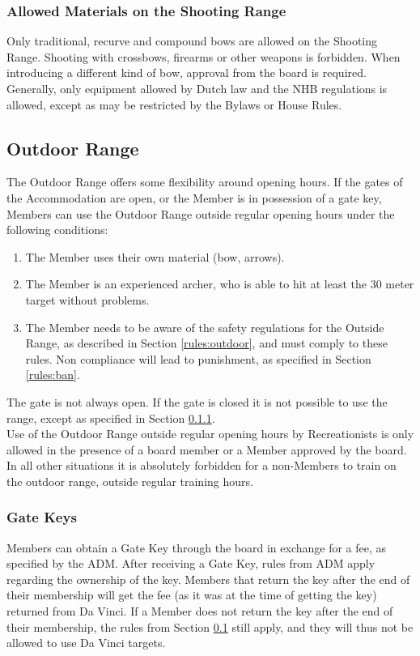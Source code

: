 \documentclass[a4paper]{article}
\begin{document}
\subsubsection{Allowed Materials on the Shooting Range}
Only traditional, recurve and compound bows are allowed on the Shooting Range. Shooting with crossbows, firearms or other weapons is forbidden. When introducing a different kind of bow, approval from the board is required. Generally, only equipment allowed by Dutch law and the { NHB} regulations is allowed, except as may be restricted by the Bylaws or House Rules.

\subsection{Outdoor Range}
\label{section:outdoor}
The Outdoor Range offers some flexibility around opening hours. If the gates of the { Accommodation} are open, or the { Member} is in possession of a gate key, { Members} can use the Outdoor Range outside regular opening hours under the following conditions:

\begin{enumerate}
\item The { Member} uses their own material (bow, arrows).
\item The { Member} is an { experienced} { archer}, who is able to hit at least the 30 meter target without problems.
\item The { Member} needs to be aware of the safety regulations for the Outside Range, as described in Section \ref{rules:outdoor}, and must comply to these rules. Non compliance will lead to punishment, as specified in Section \ref{rules:ban}.
\end{enumerate}

The gate is not always open. If the gate is closed it is not possible to use the range, except as specified in Section \ref{sec:gatekey}. \\

Use of the Outdoor Range outside regular opening hours by { Recreationists} is only allowed in the presence of a board member or a { Member} approved by the board. In all other situations it is absolutely forbidden for a non-{ Members} to train on the outdoor range, outside regular training hours. 

\subsubsection{Gate Keys}
\label{sec:gatekey}
{ Members} can obtain a Gate Key through the board in exchange for a fee, as specified by the { ADM}. After receiving a Gate Key, rules from { ADM} apply regarding the ownership of the key. { Members} that return the key after the end of their membership will get the fee (as it was at the time of getting the key) returned from Da Vinci. If a { Member} does not return the key after the end of their membership, the rules from Section \ref{section:outdoor} still apply, and they will thus not be allowed to use Da Vinci targets.
\end{document}
